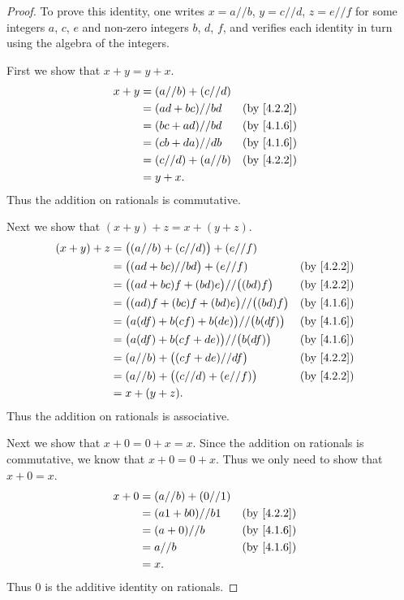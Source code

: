 \begin{proof}
  To prove this identity, one writes \(x = a // b\), \(y = c // d\), \(z = e // f\) for some integers \(a\), \(c\), \(e\) and non-zero integers \(b\), \(d\), \(f\), and verifies each identity in turn using the algebra of the integers.

  First we show that \(x + y = y + x\).
  \begin{align*}
    x + y & = (a // b) + (c // d)                 \\
          & = (ad + bc) // bd     &  & \by{4.2.2} \\
          & = (bc + ad) // bd     &  & \by{4.1.6} \\
          & = (cb + da) // db     &  & \by{4.1.6} \\
          & = (c // d) + (a // b) &  & \by{4.2.2} \\
          & = y + x.
  \end{align*}
  Thus the addition on rationals is commutative.

  Next we show that \((x + y) + z = x + (y + z)\).
  \begin{align*}
    (x + y) + z & = \big((a // b) + (c // d)\big) + (e // f)                           \\
                & = \big((ad + bc) // bd\big) + (e // f)               &  & \by{4.2.2} \\
                & = \big((ad + bc)f + (bd)e\big) // \big((bd)f\big)    &  & \by{4.2.2} \\
                & = \big((ad)f + (bc)f + (bd)e\big) // \big((bd)f\big) &  & \by{4.1.6} \\
                & = \big(a(df) + b(cf) + b(de)\big) // \big(b(df)\big) &  & \by{4.1.6} \\
                & = \big(a(df) + b(cf + de)\big) // \big(b(df)\big)    &  & \by{4.1.6} \\
                & = (a // b) + \big((cf + de) // df\big)               &  & \by{4.2.2} \\
                & = (a // b) + \big((c // d) + (e // f)\big)           &  & \by{4.2.2} \\
                & = x + (y + z).
  \end{align*}
  Thus the addition on rationals is associative.

  Next we show that \(x + 0 = 0 + x = x\).
  Since the addition on rationals is commutative, we know that \(x + 0 = 0 + x\).
  Thus we only need to show that \(x + 0 = x\).
  \begin{align*}
    x + 0 & = (a // b) + (0 // 1)                 \\
          & = (a1 + b0) // b1     &  & \by{4.2.2} \\
          & = (a + 0) // b        &  & \by{4.1.6} \\
          & = a // b              &  & \by{4.1.6} \\
          & = x.
  \end{align*}
  Thus \(0\) is the additive identity on rationals.


\end{proof}
